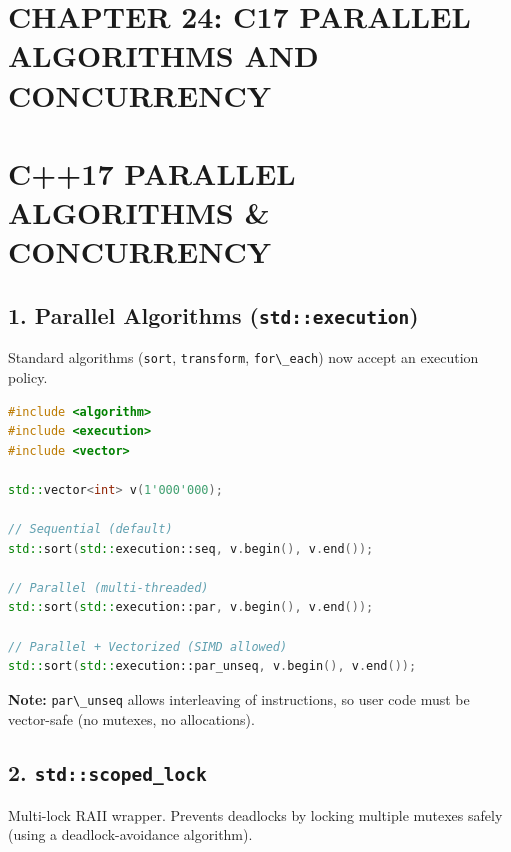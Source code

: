 \hypertarget{chapter-24-c17-parallel-algorithms-and-concurrency}{%
\section{CHAPTER 24: C17 PARALLEL ALGORITHMS AND
CONCURRENCY}\label{chapter-24-c17-parallel-algorithms-and-concurrency}}

\hypertarget{c17-parallel-algorithms-concurrency}{%
\section{C++17 PARALLEL ALGORITHMS \&
CONCURRENCY}\label{c17-parallel-algorithms-concurrency}}

\hypertarget{parallel-algorithms-stdexecution}{%
\subsection{\texorpdfstring{1. Parallel Algorithms
(\texttt{std::execution})}{1. Parallel Algorithms (std::execution)}}\label{parallel-algorithms-stdexecution}}

Standard algorithms (\passthrough{\lstinline!sort!},
\passthrough{\lstinline!transform!},
\passthrough{\lstinline!for\_each!}) now accept an execution policy.

\begin{lstlisting}[language={C++}]
#include <algorithm>
#include <execution>
#include <vector>

std::vector<int> v(1'000'000);

// Sequential (default)
std::sort(std::execution::seq, v.begin(), v.end());

// Parallel (multi-threaded)
std::sort(std::execution::par, v.begin(), v.end());

// Parallel + Vectorized (SIMD allowed)
std::sort(std::execution::par_unseq, v.begin(), v.end());
\end{lstlisting}

\textbf{Note:} \passthrough{\lstinline!par\_unseq!} allows interleaving
of instructions, so user code must be vector-safe (no mutexes, no
allocations).

\hypertarget{stdscoped_lock}{%
\subsection{\texorpdfstring{2.
\texttt{std::scoped\_lock}}{2. std::scoped\_lock}}\label{stdscoped_lock}}

Multi-lock RAII wrapper. Prevents deadlocks by locking multiple mutexes
safely (using a deadlock-avoidance algorithm).

